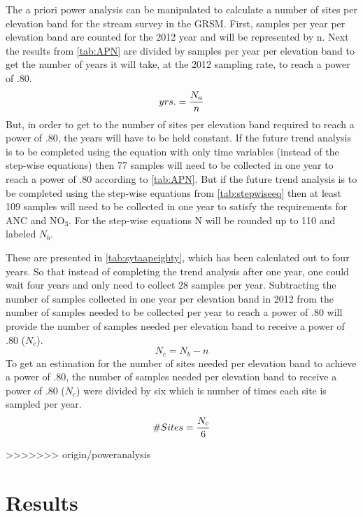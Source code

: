 

The a priori power analysis can be manipulated to calculate a number of sites per elevation band for the stream survey in the GRSM.
First, samples per year per elevation band are counted for the 2012 year and will be represented by n.
Next the results from \autoref{tab:APN} are divided by samples per year per elevation band to get the number of years it will take, at the 2012 sampling rate, to reach a power of .80.
\begin{equation} \label{eq:yrs}
	yrs. = {N_a \over n}
\end{equation}
But, in order to get to the number of sites per elevation band required to reach a power of .80, the years will have to be held constant.
If the future trend analysis is to be completed using the equation with only time variables (instead of the step-wise equations) then 77 samples will need to be collected in one year to reach a power of .80 according to \autoref{tab:APN}.
But if the future trend analysis is to be completed using the step-wise equations from \autoref{tab:stepwiseeq} then at least 109 samples will need to be collected in one year to satisfy the requirements for ANC and NO$_3$.
For the step-wise equations N will be rounded up to 110 and labeled $N_b$.

These are presented in \autoref{tab:sytaapeighty}, which has been calculated out to four years.
So that instead of completing the trend analysis after one year, one could wait four years and only need to collect 28 samples per year.
Subtracting the number of samples collected in one year per elevation band in 2012 from the number of samples needed to be collected per year to reach a power of .80 will provide the number of samples needed per elevation band to receive a power of .80 ($N_c$).
\begin{equation} \label{eq:Nc}
	N_c={N_b - n}
\end{equation}
To get an estimation for the number of sites needed per elevation band to achieve a power of .80, the number of samples needed per elevation band to receive a power of .80 ($N_c$) were divided by six which is number of times each site is sampled per year.
\begin{equation}\label{eq:sites}
	\#Sites = {N_c \over 6}
\end{equation}

>>>>>>> origin/poweranalysis
\section{Results}

